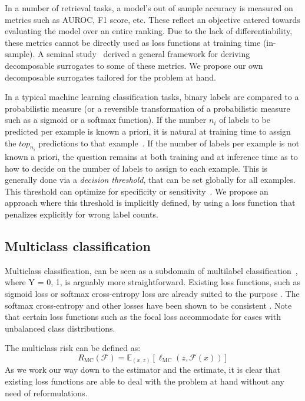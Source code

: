 In a number of retrieval tasks, a model's out of sample accuracy is measured
on metrics such as AUROC, F1 score, etc. These reflect an objective catered
towards evaluating the model over an entire ranking. Due to the lack of
differentiability, these metrics cannot be directly used as loss functions at
training time (in-sample). A seminal study~\cite{optimizableLosses} derived a
general framework for deriving decomposable surrogates to some of these
metrics. We propose our own decomposable surrogates tailored for the problem
at hand.

In a typical machine learning classification tasks, binary labels are compared to a probabilistic measure (or a reversible
transformation of a probabilistic measure such as a sigmoid or a softmax
function). If the number $n_i$ of labels to be predicted per
example is known a priori, it is natural at training time to assign the $top_{n_i}$ predictions
to that example~\cite{lossTopKError, topKmulticlassSVM}. If the number of
labels per example is not known a priori, the question remains at both training and at inference time
as to how to decide on the number of labels to assign to each
example. This is generally done via a \emph{decision threshold}, that can be set globally for all
examples. This threshold can optimize for specificity or
sensitivity~\cite{decisionThreshold}. We propose an approach where this threshold
is implicitly defined, by using a loss function that penalizes explicitly for wrong label counts.



\subsection{Multiclass classification}
\label{section:background:multiclassClassification}

Multiclass classification, can be seen as a subdomain of multilabel classification~\citep{multilabelReduction}, where Y = {0, 1}, is arguably more straightforward. Existing loss functions, such as sigmoid loss or softmax cross-entropy loss are already suited to the purpose . The softmax cross-entropy and other losses have been shown to be consistent \cite{consistency-multiclassSVM, consistency-lossAnalysis, consistency-surrogates}. Note that certain loss functions such as the focal loss accommodate for cases with unbalanced class distributions. 

The multiclass risk can be defined as:
%
\begin{equation}
R_{\mathrm{MC}}(\mathcal{F}) = \mathbb{E}_{(x, z)}\left[\ell_{\mathrm{MC}}(z, \mathcal{F}(x))\right]
\end{equation}
%
As we work our way down to the estimator and the estimate, it is clear that existing loss functions are able to deal with the problem at hand without any need of reformulations. 

